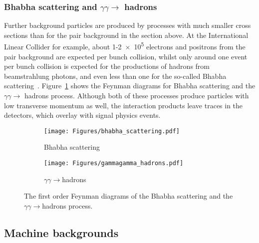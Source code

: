 \subsubsection{Bhabha scattering and $\gamma\gamma\rightarrow$ hadrons}
\label{BeamBeam:bhabha_gammagamma}
Further background particles are produced by processes with much smaller cross sections than for the pair background in the section above.
At the International Linear Collider for example, about 1-\num{2e5} electrons and positrons from the pair background are expected per bunch collision, whilst only around one event per bunch collision is expected for the productions of hadrons from beamstrahlung photons, and even less than one for the so-called Bhabha scattering~\cite{SiDBkgNote}. %
Figure~\ref{fig:Feynman:bhabha_gammagamma} shows the Feynman diagrams for Bhabha scattering and the $\gamma\gamma\rightarrow$ hadrons process.
Although both of these processes produce particles with low transverse momentum as well, the interaction products leave traces in the detectors, which overlay with signal physics events.
\begin{figure}[h!]
\centering
\begin{subfigure}[b]{0.35\textwidth}
\texttt{[image: Figures/bhabha\_scattering.pdf]}
\caption{Bhabha scattering}
\end{subfigure}
\vspace*{0.2cm}
\begin{subfigure}[b]{0.35\textwidth}
\texttt{[image: Figures/gammagamma\_hadrons.pdf]}
\caption{$\gamma\gamma\rightarrow$hadrons}
\end{subfigure}
\caption[Feynman diagrams of Bhabha scattering and the $\gamma\gamma\rightarrow$hadrons process.]{The first order Feynman diagrams of the Bhabha scattering and the $\gamma\gamma\rightarrow$hadrons process.}
\label{fig:Feynman:bhabha_gammagamma}
\end{figure}

\subsection{Machine backgrounds}
\label{MachineBackgrounds}

